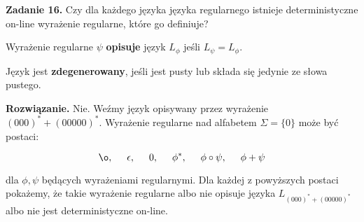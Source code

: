 \documentclass[a4paper]{article}
\begin{document}
\setlength{\parindent}{0pt}

\textbf{Zadanie 16.} Czy dla każdego języka języka regularnego istnieje deterministyczne on-line wyrażenie regularne, które go definiuje?
\vspace{1cm}

Wyrażenie regularne $\psi$ \textbf{opisuje} język $L_{\phi}$ jeśli $L_{\psi} = L_{\phi}$.

Język jest \textbf{zdegenerowany}, jeśli jest pusty lub składa się jedynie ze słowa pustego.
\vspace{1cm}

\textbf{Rozwiązanie.} Nie. Weźmy język opisywany przez wyrażenie $(000)^* + (00000)^*$. Wyrażenie regularne nad alfabetem $\Sigma = \{ 0 \}$ może być postaci:

$$ \o,\hspace{5mm} \epsilon,\hspace{5mm} 0,\hspace{5mm} \phi^*,\hspace{5mm} \phi \circ \psi,\hspace{5mm} \phi + \psi$$

dla $\phi, \psi$ będących wyrażeniami regularnymi. Dla każdej z powyższych postaci pokażemy, że takie wyrażenie regularne albo nie opisuje języka $L_{(000)^* + (00000)^*}$ albo nie jest deterministyczne on-line.
\end{document}
